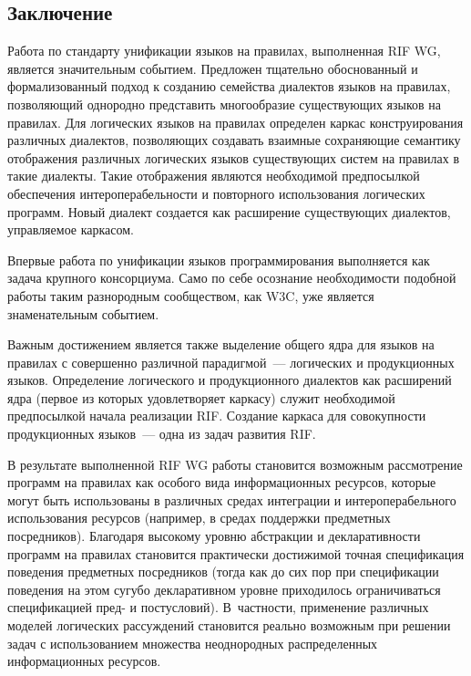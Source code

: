 \begin{multicols}{2}
\section{Заключение}

Работа по стандарту унификации языков на прави\-лах, выполненная RIF WG, является 
значительным событием. Предложен тщательно обоснованный и формализованный подход 
к созданию семейства диалектов языков на правилах, позволяющий однородно представить 
многообразие су\-ще\-ст\-ву\-ющих языков на правилах. Для логических языков на правилах 
определен каркас конструирования различных диалектов, позволяющих 
создавать взаимные сохраняющие семантику отображения различных логических языков 
су\-ще\-ст\-ву\-ющих сис\-тем на правилах в такие диалекты. Такие отображения являются 
необходимой предпосылкой обеспечения интероперабельности и повторного 
использования логических программ. Новый диалект создается как расширение 
существующих диалектов, управляемое каркасом.

Впервые работа по унификации языков программирования выполняется как задача 
крупного консорциума. Само по себе осознание необходимости подобной работы таким 
разнородным сообществом, как W3C, уже является знаменательным событием.

Важным достижением является также выделение общего ядра для языков на правилах с 
совершенно различной парадигмой~--- логических и продукционных языков. Определение 
логического и продукционного диалектов как расширений ядра (первое из которых 
удовлетворяет каркасу) служит необходимой предпосылкой начала реализации RIF. 
Создание каркаса для совокупности продукционных языков~--- одна из задач развития RIF.

В результате выполненной RIF WG работы становится возможным рассмотрение программ 
на правилах как особого вида информационных ресурсов, которые могут быть 
использованы в различных средах интеграции и интероперабельного использования 
ресурсов (например, в средах поддержки предметных посредников). Благодаря высокому 
уровню абстракции и декларативности программ на правилах становится практически 
достижимой точная спецификация поведения предметных посредников (тогда как до сих 
пор при спецификации поведения на этом сугубо декларативном уровне приходилось 
ограничиваться спецификацией пред- и постусловий). В~част\-ности, применение 
различных моделей логических рассуждений становится реально возможным при решении 
задач с использованием множества неоднородных распределенных информационных 
ресурсов.


\end{multicols}
